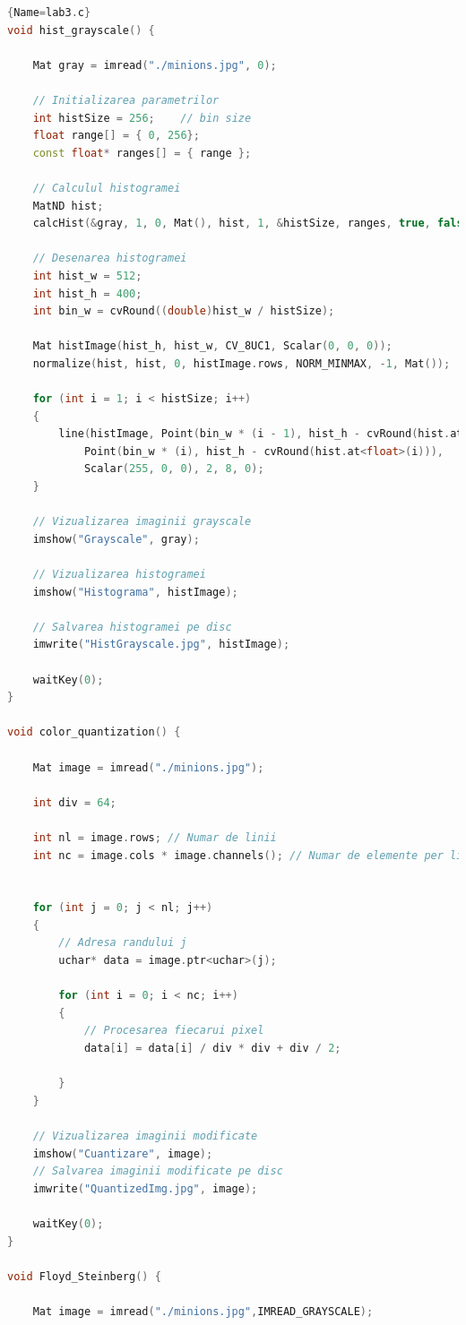 \documentclass{amsart}
\begin{document}
\begin{lstlisting}[language=C++]{Name=lab3.c}
void hist_grayscale() {

	Mat gray = imread("./minions.jpg", 0);

	// Initializarea parametrilor
	int histSize = 256;    // bin size
	float range[] = { 0, 256};
	const float* ranges[] = { range };

	// Calculul histogramei
	MatND hist;
	calcHist(&gray, 1, 0, Mat(), hist, 1, &histSize, ranges, true, false);

	// Desenarea histogramei
	int hist_w = 512;
	int hist_h = 400;
	int bin_w = cvRound((double)hist_w / histSize);

	Mat histImage(hist_h, hist_w, CV_8UC1, Scalar(0, 0, 0));
	normalize(hist, hist, 0, histImage.rows, NORM_MINMAX, -1, Mat());

	for (int i = 1; i < histSize; i++)
	{
		line(histImage, Point(bin_w * (i - 1), hist_h - cvRound(hist.at<float>(i - 1))),
			Point(bin_w * (i), hist_h - cvRound(hist.at<float>(i))),
			Scalar(255, 0, 0), 2, 8, 0);
	}

	// Vizualizarea imaginii grayscale
	imshow("Grayscale", gray);

	// Vizualizarea histogramei
	imshow("Histograma", histImage);

	// Salvarea histogramei pe disc 
	imwrite("HistGrayscale.jpg", histImage);

	waitKey(0);
}

void color_quantization() {

	Mat image = imread("./minions.jpg");

	int div = 64;

	int nl = image.rows; // Numar de linii
	int nc = image.cols * image.channels(); // Numar de elemente per linie


	for (int j = 0; j < nl; j++)
	{
		// Adresa randului j
		uchar* data = image.ptr<uchar>(j);

		for (int i = 0; i < nc; i++)
		{
			// Procesarea fiecarui pixel
			data[i] = data[i] / div * div + div / 2;
			
		}
	}

	// Vizualizarea imaginii modificate
	imshow("Cuantizare", image);
	// Salvarea imaginii modificate pe disc 
	imwrite("QuantizedImg.jpg", image);

	waitKey(0);
}

void Floyd_Steinberg() {

	Mat image = imread("./minions.jpg",IMREAD_GRAYSCALE);


\end{lstlisting}
\end{document}

